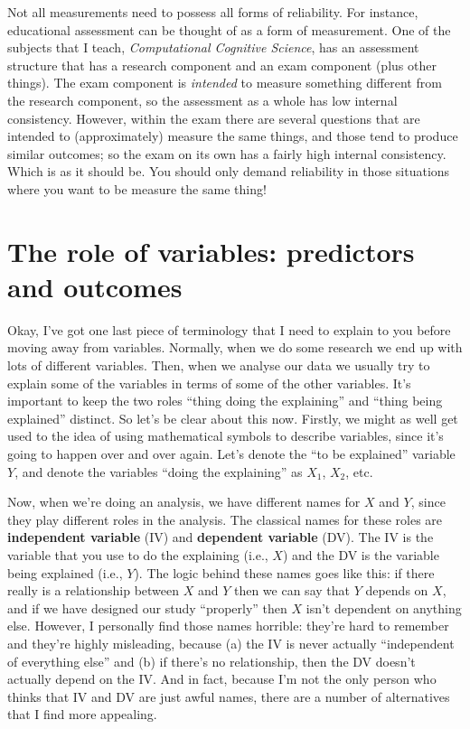 \documentclass[
]{book}
\begin{document}
Not all measurements need to possess all forms of reliability. For instance, educational assessment can be thought of as a form of measurement. One of the subjects that I teach, {\emph{Computational Cognitive Science}}, has an assessment structure that has a research component and an exam component (plus other things). The exam component is {\emph{intended}} to measure something different from the research component, so the assessment as a whole has low internal consistency. However, within the exam there are several questions that are intended to (approximately) measure the same things, and those tend to produce similar outcomes; so the exam on its own has a fairly high internal consistency. Which is as it should be. You should only demand reliability in those situations where you want to be measure the same thing!

\section{The role of variables: predictors and outcomes}\label{the-role-of-variables-predictors-and-outcomes}

Okay, I've got one last piece of terminology that I need to explain to you before moving away from variables. Normally, when we do some research we end up with lots of different variables. Then, when we analyse our data we usually try to explain some of the variables in terms of some of the other variables. It's important to keep the two roles ``thing doing the explaining'' and ``thing being explained'' distinct. So let's be clear about this now. Firstly, we might as well get used to the idea of using mathematical symbols to describe variables, since it's going to happen over and over again. Let's denote the ``to be explained'' variable \(Y\), and denote the variables ``doing the explaining'' as \(X_1\), \(X_2\), etc.

Now, when we're doing an analysis, we have different names for \(X\) and \(Y\), since they play different roles in the analysis. The classical names for these roles are \textbf{independent variable} (IV) and \textbf{dependent variable} (DV). The IV is the variable that you use to do the explaining (i.e., \(X\)) and the DV is the variable being explained (i.e., \(Y\)). The logic behind these names goes like this: if there really is a relationship between \(X\) and \(Y\) then we can say that \(Y\) depends on \(X\), and if we have designed our study ``properly'' then \(X\) isn't dependent on anything else. However, I personally find those names horrible: they're hard to remember and they're highly misleading, because (a) the IV is never actually ``independent of everything else'' and (b) if there's no relationship, then the DV doesn't actually depend on the IV. And in fact, because I'm not the only person who thinks that IV and DV are just awful names, there are a number of alternatives that I find more appealing.
\end{document}
